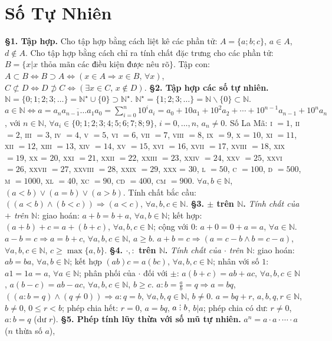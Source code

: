\documentclass{article}
\numberwithin{equation}{section}
\DeclareRobustCommand{\divby}{%
	\mathrel{\vbox{\baselineskip.65ex\lineskiplimit0pt\hbox{.}\hbox{.}\hbox{.}}}%
}
\begin{document}
\section{Số Tự Nhiên}
\textbf{\S1. Tập hợp.} Cho tập hợp bằng cách liệt kê các phần tử: $A = \{a;b;c\}$, $a\in A$, $d\notin A$. Cho tập hợp bằng cách chỉ ra tính chất đặc trưng cho các phần tử: $B = \{x|x\mbox{ thỏa mãn các điều kiện được nêu rõ}\}$. Tập con: $A\subset B\Leftrightarrow B\supset A\Leftrightarrow(x\in A\Rightarrow x\in B,\,\forall x)$, $C\not\subset D\Leftrightarrow D\not\supset C\Leftrightarrow(\exists x\in C,\,x\notin D)$. \textbf{\S2. Tập hợp các số tự nhiên.} $\mathbb{N} = \{0;1;2;3;\ldots\} = \mathbb{N}^\star\cup\{0\}\supset\mathbb{N}^\star$. $\mathbb{N}^\star = \{1;2;3;\ldots\} = \mathbb{N}\backslash\{0\}\subset\mathbb{N}$. $a\in\mathbb{N}\Leftrightarrow a = \overline{a_na_{n-1}\ldots a_1a_0} = \sum_{i=0}^n 10^ia_i = a_0 + 10a_1 + 10^2a_2 + \cdots + 10^{n-1}a_{n-1} + 10^na_n$, với $n\in\mathbb{N}$, $\forall a_i\in\{0;1;2;3;4;5;6;7;8;9\}$, $i = 0,\ldots,n$, $a_n\ne 0$. Số La Mã: \textsc{i} $= 1$, \textsc{ii} $= 2$, \textsc{iii} $= 3$, \textsc{iv} $= 4$, \textsc{v} $= 5$, \textsc{vi} $= 6$, \textsc{vii} $= 7$, \textsc{viii} $= 8$, \textsc{ix} $= 9$, \textsc{x} = $10$, \textsc{xi} $= 11$, \textsc{xii} $= 12$, \textsc{xiii} $= 13$, \textsc{xiv} $= 14$, \textsc{xv} $= 15$, \textsc{xvi} $= 16$, \textsc{xvii} $= 17$, \textsc{xviii} $= 18$, \textsc{xix} $= 19$, \textsc{xx} = $20$, \textsc{xxi} $= 21$, \textsc{xxii} $= 22$, \textsc{xxiii} $= 23$, \textsc{xxiv} $= 24$, \textsc{xxv} $= 25$, \textsc{xxvi} $= 26$, \textsc{xxvii} $= 27$, \textsc{xxviii} $= 28$, \textsc{xxix} $= 29$, \textsc{xxx} = $30$, \textsc{l} $= 50$, \textsc{c} $= 100$, \textsc{d} $= 500$, \textsc{m} $= 1000$, \textsc{xl} $= 40$, \textsc{xc} $= 90$, \textsc{cd} $= 400$, \textsc{cm} $= 900$. $\forall a,b\in\mathbb{N}$, $(a < b)\lor(a = b)\lor(a > b)$. Tính chất bắc cầu: $((a < b)\land(b < c))\Rightarrow(a < c)$, $\forall a,b,c\in\mathbb{N}$. \textbf{\S3. $\boldsymbol{\pm}$ trên $\mathbb{N}$.} \textit{Tính chất của $+$ trên $\mathbb{N}$}: giao hoán: $a + b = b + a$, $\forall a,b\in\mathbb{N}$; kết hợp: $(a + b) + c = a + (b + c)$, $\forall a,b,c\in\mathbb{N}$; cộng với $0$: $a + 0 = 0 + a = a$, $\forall a\in\mathbb{N}$. $a - b = c\Rightarrow a = b + c$, $\forall a,b,c\in\mathbb{N}$, $a\ge b$. $a + b = c\Rightarrow(a = c - b\land b = c - a)$, $\forall a,b,c\in\mathbb{N}$, $c\ge\max\{a,b\}$. \textbf{\S4. $\boldsymbol{\cdot,:}$ trên $\mathbb{N}$.} \textit{Tính chất của $\cdot$ trên $\mathbb{N}$}: giao hoán: $ab = ba$, $\forall a,b\in\mathbb{N}$; kết hợp $(ab)c = a(bc)$, $\forall a,b,c\in\mathbb{N}$; nhân với số $1$: $a1 = 1a = a$, $\forall a\in\mathbb{N}$; phân phối của $\cdot$ đối với $\pm$: $a(b + c) = ab + ac$, $\forall a,b,c\in\mathbb{N}$, $a(b - c) = ab - ac$, $\forall a,b,c\in\mathbb{N}$, $b\ge c$. $a:b = \frac{a}{b} = q\Rightarrow a = bq$, $((a:b = q)\land(q\ne 0))\Rightarrow a:q = b$, $\forall a,b,q\in\mathbb{N}$, $b\ne 0$. $a = bq + r$, $a,b,q,r\in\mathbb{N}$, $b\ne 0$, $0\le r < b$; phép chia hết: $r = 0$, $a = bq$, $a\divby b$, $b|a$; phép chia có dư: $r\ne 0$, $a:b = q$ (dư $r$). \textbf{\S5. Phép  tính lũy thừa với số mũ tự nhiên.} $a^n = a\cdot a\cdot\cdots\cdot a$ ($n$ thừa số $a$), 
\end{document}
